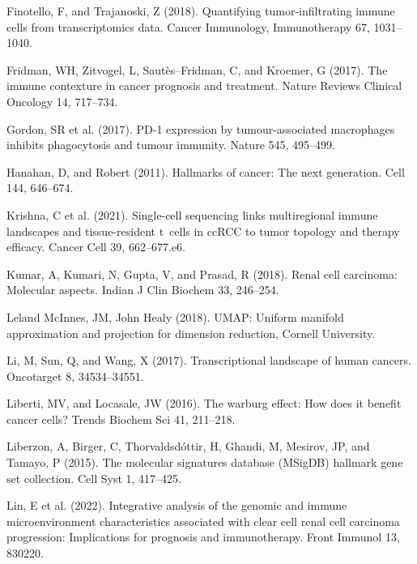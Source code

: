 \documentclass[
  parskip,
  oneside]{\documentclass[oneside]{book}}
\newlength{\cslhangindent}
\newlength{\cslentryspacingunit} %
\newenvironment{CSLReferences}[2] %
 {%
  \setlength{\parindent}{0pt}
  \ifodd #1
  \let\oldpar\par
  \def\par{\hangindent=\cslhangindent\oldpar}
  \fi
  \setlength{\parskip}{#2\cslentryspacingunit}
 }%
 {}
\begin{document}
\begin{CSLReferences}{0}{0}
\leavevmode{}%
Finotello, F, and Trajanoski, Z (2018). Quantifying tumor-infiltrating
immune cells from transcriptomics data. Cancer Immunology, Immunotherapy
67, 1031--1040.

\leavevmode{}%
Fridman, WH, Zitvogel, L, Sautès--Fridman, C, and Kroemer, G (2017). The
immune contexture in cancer prognosis and treatment. Nature Reviews
Clinical Oncology 14, 717--734.

\leavevmode{}%
Gordon, SR et al. (2017). PD-1 expression by tumour-associated
macrophages inhibits phagocytosis and tumour immunity. Nature 545,
495--499.

\leavevmode{}%
Hanahan, D, and Robert (2011). Hallmarks of cancer: The next generation.
Cell 144, 646--674.

\leavevmode{}%
Krishna, C et al. (2021). Single-cell sequencing links multiregional
immune landscapes and tissue-resident t~cells in ccRCC to tumor topology
and therapy efficacy. Cancer Cell 39, 662--677.e6.

\leavevmode{}%
Kumar, A, Kumari, N, Gupta, V, and Prasad, R (2018). Renal cell
carcinoma: Molecular aspects. Indian J Clin Biochem 33, 246--254.

\leavevmode{}%
Leland McInnes, JM, John Healy (2018). UMAP: Uniform manifold
approximation and projection for dimension reduction, Cornell
University.

\leavevmode{}%
Li, M, Sun, Q, and Wang, X (2017). Transcriptional landscape of human
cancers. Oncotarget 8, 34534--34551.

\leavevmode{}%
Liberti, MV, and Locasale, JW (2016). The warburg effect: How does it
benefit cancer cells? Trends Biochem Sci 41, 211--218.

\leavevmode{}%
Liberzon, A, Birger, C, Thorvaldsdóttir, H, Ghandi, M, Mesirov, JP, and
Tamayo, P (2015). The molecular signatures database (MSigDB) hallmark
gene set collection. Cell Syst 1, 417--425.

\leavevmode{}%
Lin, E et al. (2022). Integrative analysis of the genomic and immune
microenvironment characteristics associated with clear cell renal cell
carcinoma progression: Implications for prognosis and immunotherapy.
Front Immunol 13, 830220.


\end{CSLReferences}
\end{document}
